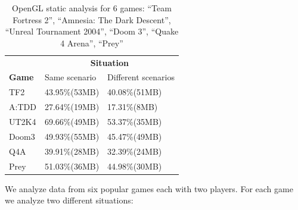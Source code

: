 \documentclass[pageno]{jpaper}
\begin{document}
	
	\begin{table}[ht]
	  \centering
	  \begin{tabular}{|l|l|l|}
		\hline
		& \multicolumn{2}{c|}{\textbf{Situation}}\\\cline{1-2}\cline{2-3}
		\textbf{Game} & Same scenario& Different scenarios\\
		\hline
		\hline
		TF2&43.95\%(53MB)&40.08\%(51MB)\\
		\hline
		A:TDD&27.64\%(19MB)&17.31\%(8MB)\\
		\hline
		UT2K4&69.66\%(49MB)&53.37\%(35MB)\\
		\hline
        Doom3&49.93\%(55MB)&45.47\%(49MB)\\
		\hline
        Q4A&39.91\%(28MB)&32.39\%(24MB)\\
		\hline
        Prey&51.03\%(36MB)&44.98\%(30MB)\\
		\hline
	  \end{tabular}
	  \caption{OpenGL static analysis for 6 games: ``Team Fortress 2'', ``Amnesia: The Dark Descent'', ``Unreal Tournament 2004'', ``Doom 3'', ``Quake 4 Arena'', ``Prey''}
	  \label{table:analysis}
	\end{table}
%	
We analyze data from six popular games each with two players. For each game we analyze two different situations:
\end{document}

